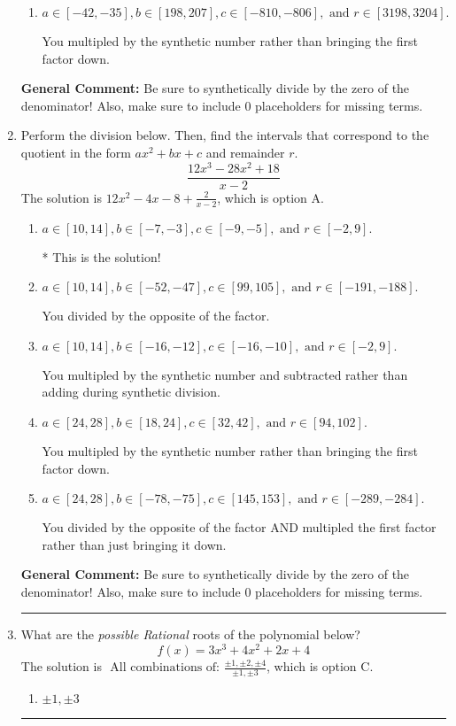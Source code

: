 \documentclass{extbook}[14pt]
\newcommand{\litem}[1]{\item #1

\rule{\textwidth}{0.4pt}}
\begin{document}
\begin{enumerate}
{\begin{enumerate}[label=\Alph*.]
 You divided by the opposite of the factor.
\item \( a \in [-42, -35], b \in [198, 207], c \in [-810, -806], \text{ and } r \in [3198, 3204]. \)

 You multipled by the synthetic number rather than bringing the first factor down.
\end{enumerate}

\textbf{General Comment:} Be sure to synthetically divide by the zero of the denominator! Also, make sure to include 0 placeholders for missing terms.
}
\litem{
Perform the division below. Then, find the intervals that correspond to the quotient in the form $ax^2+bx+c$ and remainder $r$.
\[ \frac{12x^{3} -28 x^{2} + 18}{x -2} \]The solution is \( 12x^{2} -4 x -8 + \frac{2}{x -2} \), which is option A.\begin{enumerate}[label=\Alph*.]
\item \( a \in [10, 14], b \in [-7, -3], c \in [-9, -5], \text{ and } r \in [-2, 9]. \)

* This is the solution!
\item \( a \in [10, 14], b \in [-52, -47], c \in [99, 105], \text{ and } r \in [-191, -188]. \)

 You divided by the opposite of the factor.
\item \( a \in [10, 14], b \in [-16, -12], c \in [-16, -10], \text{ and } r \in [-2, 9]. \)

 You multipled by the synthetic number and subtracted rather than adding during synthetic division.
\item \( a \in [24, 28], b \in [18, 24], c \in [32, 42], \text{ and } r \in [94, 102]. \)

 You multipled by the synthetic number rather than bringing the first factor down.
\item \( a \in [24, 28], b \in [-78, -75], c \in [145, 153], \text{ and } r \in [-289, -284]. \)

 You divided by the opposite of the factor AND multipled the first factor rather than just bringing it down.
\end{enumerate}

\textbf{General Comment:} Be sure to synthetically divide by the zero of the denominator! Also, make sure to include 0 placeholders for missing terms.
}
\litem{
What are the \textit{possible Rational} roots of the polynomial below?
\[ f(x) = 3x^{3} +4 x^{2} +2 x + 4 \]The solution is \( \text{ All combinations of: }\frac{\pm 1,\pm 2,\pm 4}{\pm 1,\pm 3} \), which is option C.\begin{enumerate}[label=\Alph*.]
\item \( \pm 1,\pm 3 \)


\end{enumerate}}
\end{enumerate}
\end{document}
